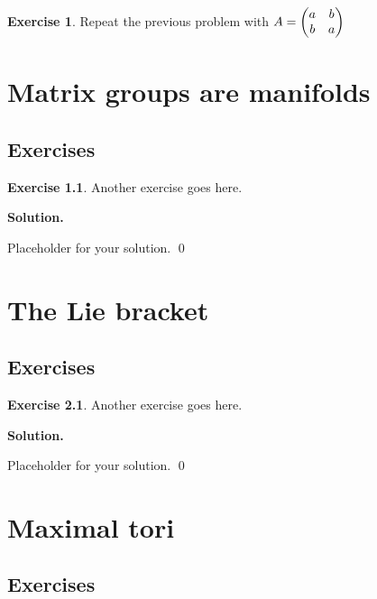 \documentclass[12pt]{book}
\theoremstyle{definition}
\newtheorem{exercise}{Exercise}[chapter]
\newenvironment{solution}
{%
  \par\noindent\textbf{Solution.}\quad
}
{%
  \qed\par
}
\begin{document}
\begin{exercise}
  Repeat the previous problem with $A = \begin{pmatrix} a & b \\ b & a \end{pmatrix}$
\end{exercise}

\chapter{Matrix groups are manifolds}
\section{Exercises}

\begin{exercise}
Another exercise goes here.
\end{exercise}

\begin{solution}
Placeholder for your solution.
\end{solution}

\chapter{The Lie bracket}
\section{Exercises}

\begin{exercise}
Another exercise goes here.
\end{exercise}

\begin{solution}
Placeholder for your solution.
\end{solution}

\chapter{Maximal tori}
\section{Exercises}
\end{document}
